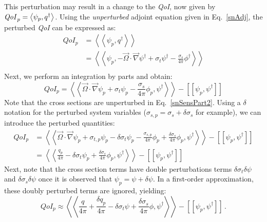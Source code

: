 \documentclass[12pt]{report}
\newcommand{\vO}{\vec{\Omega}}
\newcommand{\bra}{\left\langle}
\newcommand{\ket}{\right\rangle}
\newcommand{\braSN}{\left\langle \! \left\langle}
\newcommand{\ketSN}{\right\rangle \! \right\rangle}
\newcommand{\sbraSN}{\left[ \! \left[}
\newcommand{\sketSN}{\right] \! \right]}
\newcommand{\grad}{\vec{\nabla}}
\newcommand{\sigt}{\sigma_t}
\newcommand{\sigs}{\sigma_s}
\newcommand{\angSource}{\frac{q}{4 \pi}}
\newcommand{\angSourcep}{\frac{q_p}{4 \pi}}
\newcommand{\angSourced}{\frac{\delta q_p}{4 \pi}}
\newcommand{\angResp}{q^\dag}
\newcommand{\qoi}{{\it QoI}\xspace}
\begin{document}
This perturbation may result in a change to the \qoi, now given by $\qoi_p=\bra \psi_p , \angResp \ket$. Using the {\it unperturbed} adjoint equation given in Eq.~\eqref{snAdj},
the perturbed \qoi can be expressed as:
\begin{equation}
\label{snSensPart}
\begin{split}
QoI_p &=\braSN \psi_p , \angResp \ketSN \\
&=\braSN \psi_p , - \vO \cdot \grad \psi^\dag + \sigt \psi^\dag - \frac{\sigs}{4 \pi} \phi^\dag  \ketSN \\
\end{split}
\end{equation}
Next, we perform an integration by parts and obtain:
\begin{equation}
\label{snSensPart2}
QoI_p = \braSN  \vO \cdot \grad \psi_p + \sigt \psi_p - \frac{\sigs}{4 \pi} \phi_p , \psi^\dag  \ketSN - \sbraSN \psi_p, \psi^\dag \sketSN
\end{equation}
Note that the cross sections are unperturbed in Eq.~\eqref{snSensPart2}.
Using a $\delta$ notation for the perturbed system variables ($\sigma_{s,p} = \sigs + \delta \sigs$ for example), we
can introduce the perturbed quantities:
\begin{equation}
\label{snSensPart3}
\begin{split}
QoI_p &= \braSN  \vO \cdot \grad \psi_p + \sigma_{t,p}\psi_p - \delta\sigt\psi_p - \frac{\sigma_{s,p}}{4 \pi} \phi_p
+\frac{\delta \sigs}{4 \pi} \phi_p
 , \psi^\dag  \ketSN - \sbraSN \psi_p, \psi^\dag \sketSN \\
 &= \braSN  \angSourcep - \delta\sigt\psi_p + \frac{\delta \sigs}{4 \pi} \phi_p
 , \psi^\dag  \ketSN - \sbraSN \psi_p, \psi^\dag \sketSN
\end{split}
\end{equation}
Next, note that the cross section terms have double perturbations terms $\delta \sigt \delta \psi$ and $\delta \sigs \delta \psi$ once it is observed
that $\psi_p=\psi+\delta\psi$. In a first-order approximation, these doubly perturbed terms are ignored, yielding:
\begin{equation}
\label{snAdjQoIp}
QoI_p \approx \braSN  \angSource + \angSourced - \delta\sigt\psi + \frac{\delta \sigs}{4 \pi} \phi
 , \psi^\dag  \ketSN - \sbraSN \psi_p, \psi^\dag \sketSN \,.
\end{equation}
\end{document}
